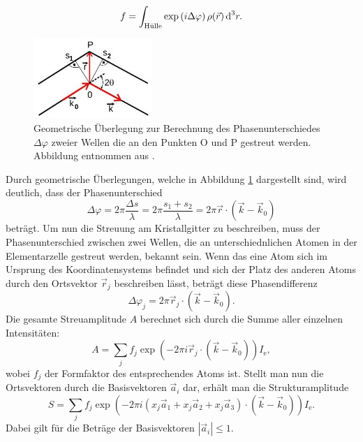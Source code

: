 \begin{equation}
  f=\int_\text{Hülle}\exp\left(i\Delta\varphi\right)\rho(\vec r)\,\text{d}^3r.
\end{equation}
\begin{figure}
\includegraphics[width=0.4\textwidth]{abb8.jpg}
\caption{Geometrische Überlegung zur Berechnung des Phasenunterschiedes $\Delta \varphi$ zweier Wellen die an den Punkten O und P gestreut werden. Abbildung entnommen aus \cite{V41}.}
\label{abb:8}
\end{figure}
Durch geometrische Überlegungen, welche in Abbildung \ref{abb:8} dargestellt sind, wird deutlich, dass der Phasenunterschied
\begin{equation}
  \label{eq:7}
  \Delta \varphi=2\pi \frac{\Delta s}{\lambda}=2\pi \frac{s_1+s_2}{\lambda}=2\pi\vec r \cdot \left(\vec k- \vec k_0\right)
\end{equation}
beträgt.
Um nun die Streuung am Kristallgitter zu beschreiben, muss  der Phasenunterschied zwischen zwei Wellen, die an unterschiednlichen Atomen in der Elementarzelle gestreut werden, bekannt sein.
Wenn das eine Atom sich im Ursprung des Koordinatensystems befindet und sich der Platz des anderen Atoms durch den Ortsvektor $\vec r_j$ beschreiben lässt, beträgt diese Phasendifferenz
\begin{equation}
  \Delta \varphi_j = 2\pi \vec r_j\cdot \left(\vec k-\vec k_0\right).
\end{equation}
Die gesamte Streuamplitude $A$ berechnet sich durch die Summe aller einzelnen Intensitäten:
\begin{equation}
  A=\sum_jf_j\exp\left(-2\pi i \vec r _j\cdot\left(\vec k-\vec k_0\right)\right)I_\text{e},
\end{equation}
wobei $f_j$ der Formfaktor des entsprechendes Atoms ist.
Stellt man nun die Ortsvektoren durch die Basisvektoren $\vec a_i$ dar, erhält man die Strukturamplitude
\begin{equation}
  S=\sum_jf_j\exp\left(-2\pi i \left(x_j\vec a_1+x_j\vec a_2+x_j\vec a_3 \right)\cdot\left(\vec k-\vec k_0\right)\right)I_\text{e}.
\end{equation}
Dabei gilt für die Beträge der Basisvektoren $|\vec a_i|\le 1$.
